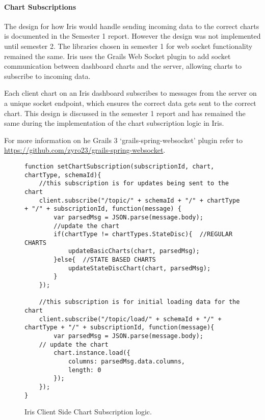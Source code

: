 \documentclass[12pt,a4paper,titlepage]{report}
\begin{document}
\paragraph{Chart Subscriptions}\label{para:charts:subs:frontend}

The design for how Iris would handle sending incoming data to the correct charts is documented in the Semester 1 report. However the design was not implemented until semester 2. The libraries chosen in semester 1 for web socket functionality remained the same. Iris uses the Grails Web Socket plugin to add socket communication between dashboard charts and the server, allowing charts to subscribe to incoming data. 

Each client chart on an Iris dashboard subscribes to messages from the server on a unique socket endpoint, which ensures the correct data gets sent to the correct chart. This design is discussed in the semester 1 report and has remained the same during the implementation of the chart subscription logic in Iris.

For more information on he Grails 3 `grails-spring-websocket' plugin refer to \url{https://github.com/zyro23/grails-spring-websocket}.
\begin{figure}[H]
\begin{tcolorbox}
\begin{verbatim}
function setChartSubscription(subscriptionId, chart, chartType, schemaId){
    //this subscription is for updates being sent to the chart
    client.subscribe("/topic/" + schemaId + "/" + chartType + "/" + subscriptionId, function(message) {
        var parsedMsg = JSON.parse(message.body);
        //update the chart
        if(chartType != chartTypes.StateDisc){  //REGULAR CHARTS
            updateBasicCharts(chart, parsedMsg);
        }else{  //STATE BASED CHARTS
            updateStateDiscChart(chart, parsedMsg);
        }
    });

    //this subscription is for initial loading data for the chart
    client.subscribe("/topic/load/" + schemaId + "/" + chartType + "/" + subscriptionId, function(message){
        var parsedMsg = JSON.parse(message.body);
    // update the chart
        chart.instance.load({
            columns: parsedMsg.data.columns,
            length: 0
        });
    });
}
\end{verbatim}
\end{tcolorbox}
\caption{Iris Client Side Chart Subscription logic.}
\end{figure}
\end{document}
